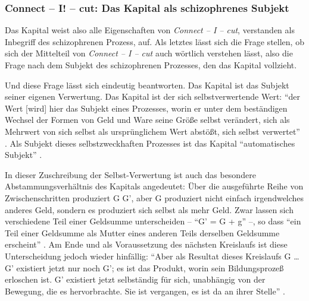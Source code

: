 \documentclass[12pt,
               DIV13,
               paper=a4,
               twoside=false,
               onehalfspacing,
               bibliography=totoc,
               toc=graduated,
               draft,
               ]{scrartcl}
\newcommand{\pc}[2]{\parencite[#1]{#2}}
\newcommand{\cic}{Connect -- I -- cut\xspace}
\begin{document}

\subsubsection{Connect -- I! -- cut: Das Kapital als schizophrenes Subjekt}

Das Kapital weist also alle Eigenschaften von \emph{\cic}, verstanden
als Inbegriff des schizophrenen Prozess, auf. Als letztes lässt sich
die Frage stellen, ob sich der Mittelteil von \emph{\cic} auch
wörtlich verstehen lässt, also die Frage nach dem Subjekt des
schizophrenen Prozesses, den das Kapital vollzieht.

Und diese Frage lässt sich eindeutig beantworten. Das Kapital ist das
Subjekt seiner eigenen Verwertung. Das Kapital ist der sich
selbstverwertende Wert: "`der Wert [wird] hier das Subjekt eines
Prozesses, worin er unter dem beständigen Wechsel der Formen von Geld
und Ware seine Größe selbst verändert, sich als Mehrwert von sich
selbst als ursprünglichem Wert abstößt, sich selbst verwertet"'
\pc{169}{kap}. Als Subjekt dieses selbstzweckhaften Prozesses ist das
Kapital "`automatisches Subjekt"' \pc{169}{kap}.

In dieser Zuschreibung der Selbst-Verwertung ist auch das besondere
\glq Abstammungsverhältnis\grq{} des Kapitals angedeutet: Über die
ausgeführte Reihe von Zwischenschritten \glq produziert\grq{} G G',
aber G \glq produziert\grq{} nicht einfach irgendwelches anderes Geld,
sondern es produziert sich selbst als mehr Geld. Zwar lassen sich
verschiedene Teil einer Geldsumme unterscheiden -- "`G' = G + g"'
\pc{51}{kap2} --, so dass "`ein Teil einer Geldsumme als Mutter eines
anderen Teils derselben Geldsumme erscheint"' \pc{55}{kap2}. Am Ende
und als Voraussetzung des nächsten Kreislaufs ist diese Unterscheidung
jedoch wieder hinfällig: "`Aber als Resultat dieses Kreislaufs G \dots
G' existiert jetzt nur noch G'; es ist das Produkt, worin sein
Bildungsprozeß erloschen ist. G' existiert jetzt selbständig für sich,
unabhängig von der Bewegung, die es hervorbrachte. Sie ist vergangen,
es ist da an ihrer Stelle"' \pc{49}{kap2}.
\end{document}
